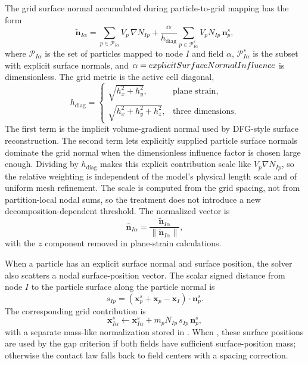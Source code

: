 The grid surface normal accumulated during particle-to-grid mapping has the form
\begin{equation}
  \widetilde{\mathbf{n}}_{I\alpha}
  =\sum_{p\in\mathcal{P}_{I\alpha}} V_p\,\nabla N_{Ip}
  +\frac{\alpha}{h_{\mathrm{diag}}}
   \sum_{p\in\mathcal{P}^{s}_{I\alpha}} V_p N_{Ip}\,\mathbf{n}^{s}_p,
  \label{eq:contact-normal-scatter}
\end{equation}
where $\mathcal{P}_{I\alpha}$ is the set of particles mapped to node $I$ and field $\alpha$, $\mathcal{P}^{s}_{I\alpha}$ is the subset with explicit surface normals, and $\alpha=explicitSurfaceNormalInfluence$ is dimensionless.  The grid metric is the active cell diagonal,
\begin{equation}
  h_{\mathrm{diag}}=
  \begin{cases}
    \sqrt{h_x^2+h_y^2}, & \text{plane strain},\\
    \sqrt{h_x^2+h_y^2+h_z^2}, & \text{three dimensions}.
  \end{cases}
\end{equation}
The first term is the implicit volume-gradient normal used by DFG-style surface reconstruction.  The second term lets explicitly supplied particle surface normals dominate the grid normal when the dimensionless influence factor is chosen large enough.  Dividing by $h_{\mathrm{diag}}$ makes this explicit contribution scale like $V_p\nabla N_{Ip}$, so the relative weighting is independent of the model's physical length scale and of uniform mesh refinement.  The scale is computed from the grid spacing, not from partition-local nodal sums, so the treatment does not introduce a new decomposition-dependent threshold.  The normalized vector is
\begin{equation}
  \hat{\mathbf{n}}_{I\alpha}=\frac{\widetilde{\mathbf{n}}_{I\alpha}}{\|\widetilde{\mathbf{n}}_{I\alpha}\|},
\end{equation}
with the $z$ component removed in plane-strain calculations.

When a particle has an explicit surface normal and surface position, the solver also scatters a nodal surface-position vector.  The scalar signed distance from node $I$ to the particle surface along the particle normal is
\begin{equation}
  s_{Ip}=\left(\mathbf{x}^{s}_p+\mathbf{x}_p-\mathbf{x}_I\right)\cdot\mathbf{n}^{s}_p.
\end{equation}
The corresponding grid contribution is
\begin{equation}
  \mathbf{x}^{s}_{I\alpha}
  \leftarrow
  \mathbf{x}^{s}_{I\alpha}
  +m_p N_{Ip}\,s_{Ip}\,\mathbf{n}^{s}_p,
  \label{eq:contact-surface-position-scatter}
\end{equation}
with a separate mass-like normalization stored in .  When , these surface positions are used by the gap criterion if both fields have sufficient surface-position mass; otherwise the contact law falls back to field centers with a spacing correction.

